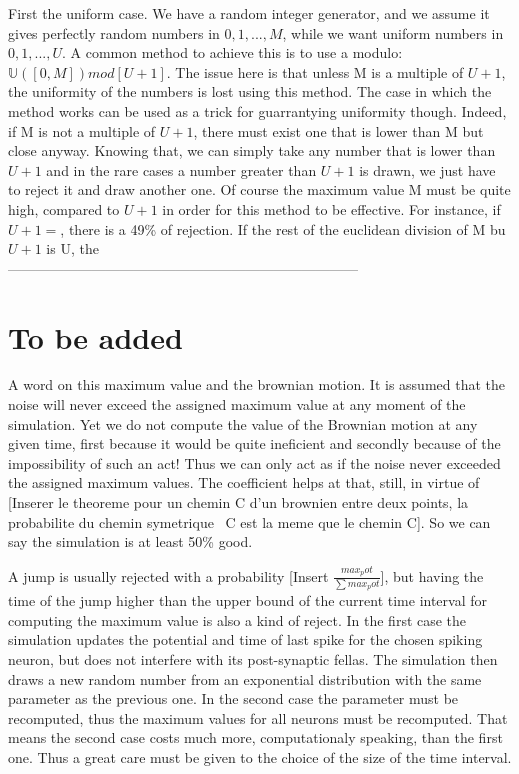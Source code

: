 \documentclass{report}
\begin{document}
	First the uniform case. We have a random integer generator, and we assume it gives perfectly random numbers in $ {0, 1, ..., M} $, while we want uniform numbers in $ {0, 1, ..., U} $. A common method to achieve this is to use a modulo: $ \mathbb{U}([0, M]) mod[U+1] $. The issue here is that unless M is a multiple of $ U+1 $, the uniformity of the numbers is lost using this method. The case in which the method works can be used as a trick for guarrantying uniformity though. Indeed, if M is not a multiple of $ U+1 $, there must exist one that is lower than M but close anyway. Knowing that, we can simply take any number that is lower than $ U+1 $ and in the rare cases a number greater than $ U+1 $ is drawn, we just have to reject it and draw another one. Of course the maximum value M must be quite high, compared to $ U+1 $ in order for this method to be effective. For instance, if $ U+1= $, there is a 49\% of rejection. If the rest of the euclidean division of M bu $ U+1 $ is U, the 
	\\---------------------------------------------------------------------------

\section{To be added}
	A word on this maximum value and the brownian motion. It is assumed that the noise will never exceed the assigned maximum value at any moment of the simulation. Yet we do not compute the value of the Brownian motion at any given time, first because it would be quite ineficient and secondly because of the impossibility of such an act! Thus we can only act as if the noise never exceeded the assigned maximum values. The coefficient helps at that, still, in virtue of [Inserer le theoreme pour un chemin C d'un brownien entre deux points, la probabilite du chemin symetrique ~C est la meme que le chemin C]. So we can say the simulation is at least 50\% good.

	A jump is usually rejected with a probability [Insert $\frac{max_pot}{\sum max_pot}$], but having the time of the jump higher than the upper bound of the current time interval for computing the maximum value is also a kind of reject. In the first case the simulation updates the potential and time of last spike for the chosen spiking neuron, but does not interfere with its post-synaptic fellas. The simulation then draws a new random number from an exponential distribution with the same parameter as the previous one. In the second case the parameter must be recomputed, thus the maximum values for all neurons must be recomputed. That means the second case costs much more, computationaly speaking, than the first one. Thus a great care must be given to the choice of the size of the time interval.\\
\end{document}
